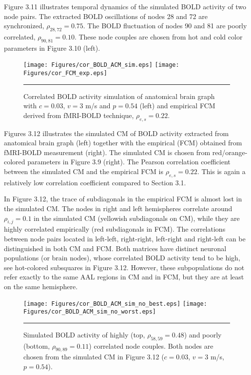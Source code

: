 Figure 3.11 illustrates temporal dynamics of the simulated BOLD activity of two node pairs. The extracted BOLD oscillations of nodes 28 and 72 are synchronized, $\rho_{28,72}=0.75$. The BOLD fluctuation of nodes 90 and 81 are poorly correlated, $\rho_{90,81}=0.10$. These node couples are chosen from hot and cold color parameters in Figure 3.10 (left).

\begin{figure}[htbp]
 
  \centering
	 \texttt{[image: Figures/cor\_BOLD\_ACM\_sim.eps]} 
   	 \texttt{[image: Figures/cor\_FCM\_exp.eps]} 

    \rule{35em}{0.5pt}
  \caption[High correlated BOLD simulation, ACM]{Correlated BOLD activity simulation of anatomical brain graph with $c=0.03$, $v=3$ m/s and $p=0.54$ (left) and empirical FCM derived from fMRI-BOLD technique, $\rho_{e,s} = 0.22$.} 
    \label{fig:High correlated BOLD simulation, ACM}
 	
\end{figure}  

Figures 3.12 illustrates the simulated CM of BOLD activity extracted from anatomical brain graph (left) together with the empirical (FCM) obtained from fMRI-BOLD measurement (right). The simulated CM is chosen from red/orange-colored parameters in Figure 3.9 (right). The Pearson correlation coefficient between the simulated CM and the empirical FCM is $\rho_{e,s} = 0.22$. This is again a relatively low correlation coefficient compared to Section 3.1. 

In Figure 3.12, the trace of subdiagonals in the empirical FCM is almost lost in the simulated CM. The nodes in right and left hemispheres correlate around $\rho_{i,j}=0.1$ in the simulated CM (yellowish subdiagonals on CM), while they are highly correlated empirically (red subdiagonals in FCM). The correlations between node pairs located in left-left, right-right, left-right and right-left can be distinguished in both CM and FCM. Both matrices have distinct neuronal populations (or brain nodes), whose correlated BOLD activity tend to be high, see hot-colored subsquares in Figure 3.12. However, these subpopulations do not refer exactly to the same AAL regions in CM and in FCM, but they are at least on the same hemisphere. 

\begin{figure}[htbp]
 
  \centering
	 \texttt{[image: Figures/cor\_BOLD\_ACM\_sim\_no\_best.eps]} 
   	 \texttt{[image: Figures/cor\_BOLD\_ACM\_sim\_no\_worst.eps]} 

    \rule{35em}{0.5pt}
  \caption[BOLD Activity Node Dynamics, ACM]{Simulated BOLD activity of highly (top, $\rho_{58,59}=0.48$) and poorly (bottom, $\rho_{90,89}=0.11$) correlated node couples. Both nodes are chosen from the simulated CM in Figure 3.12 ($c=0.03$, $v=3$ m/s, $p=0.54$).} 
    \label{fig:BOLD Activity Node Dynamics, ACM}
 	
\end{figure} 



